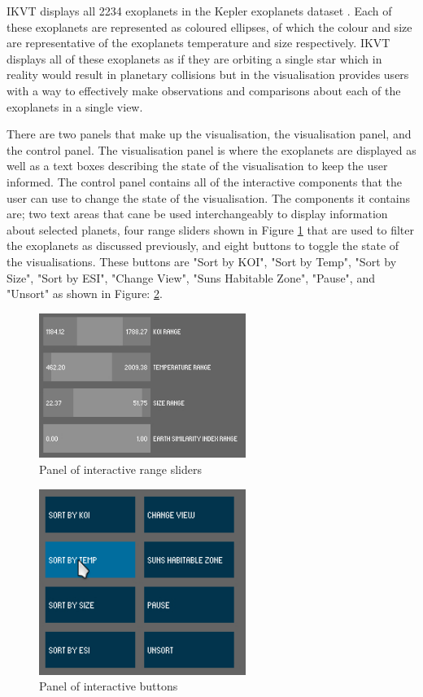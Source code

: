 IKVT displays all 2234 exoplanets
in the Kepler exoplanets dataset \cite{dataset}. Each of these exoplanets are
represented as coloured
ellipses, of which the colour and size are representative of the exoplanets
temperature and size respectively. IKVT displays all of these exoplanets as if
they are orbiting a single star which in reality would result in planetary
collisions but in the visualisation provides users with a way to effectively
make observations and comparisons about each of the exoplanets in a single
view. 

There are two panels that make up the visualisation, the visualisation panel,
and the control panel. The visualisation panel is where the exoplanets
are displayed as well as a text boxes describing the state of the visualisation
to
keep the user informed. The control panel contains all of the interactive
components that the user can use to change the state of the visualisation. The
components it contains are; two text areas that cane be used interchangeably to
display information about selected planets, four range sliders shown in Figure 
\ref{fig:sliders} that are used to
filter the exoplanets as discussed previously, and eight buttons to toggle the
state of the visualisations. These buttons are "Sort by KOI", "Sort by Temp",
"Sort by Size", "Sort by ESI", "Change View", "Suns Habitable Zone", "Pause",
and "Unsort" as shown in Figure: \ref{fig:buttons}. 

\begin{figure}[H]
  \centering
      \includegraphics[width=0.6\textwidth]{images/sliders.jpg}
  \caption{Panel of interactive range sliders}
  \label{fig:sliders}
\end{figure}

\begin{figure}[H]
  \centering
      \includegraphics[width=0.6\textwidth]{images/buttons.jpg}
  \caption{Panel of interactive buttons}
  \label{fig:buttons}
\end{figure}

